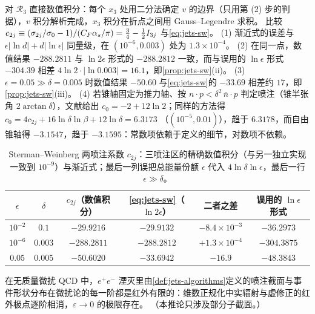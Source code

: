 \begin{example}\label{ex:jets-sw}
对 $\mathcal R_3$ 直接数值积分：每个 $x_3$ 处用二分法确定 $v$ 的边界（只用第 (2) 步的判据），$v$ 积分解析完成，$x_3$ 积分在折点之间用 Gauss--Legendre 求积。
比较 $c_{2j}\equiv(\sigma_{2j}/\sigma_0-1)/(C_F\alpha_s/\pi)=\frac34-\frac12I_{3j}$ 与\cref{eq:jets-sw}。
(1) 渐近式的误差与 $\epsilon|\ln d|+d|\ln\epsilon|$ 同量级，在 $(10^{-6},0.003)$ 处为 $1.3\times10^{-4}$。
(2) 在同一点，数值结果 $-288.2811$ 与 $\ln2\epsilon$ 形式的 $-288.2812$ 一致，而与误用的 $\ln\epsilon$ 形式 $-304.39$ 相差 $4\ln2\cdot|\ln0.003|=16.1$，即\cref{prop:jets-sw}(ii)。
(3) $\epsilon=0.05\gg\delta=0.005$ 时数值结果 $-50.60$ 与\cref{eq:jets-sw}的 $-33.69$ 相差约 $17$，即\cref{prop:jets-sw}(iii)。
(4) 若锥轴固定为推力轴、按 $n\cdot p<\delta^2\,\bar n\cdot p$ 判定喷注（锥半张角 $2\arctan\delta$），文献给出 $c_0=-2+12\ln2$\cite{Becher:2015hka}；同样的方法得 $c_0=4c_{2j}+16\ln\delta\ln\beta+12\ln\delta=6.3173$
（$(10^{-5},0.01)$），趋于 $6.3178$，而自由锥轴得 $-3.1547$，趋于 $-3.1595$：常数项依赖于定义的细节，对数项不依赖。
\end{example}

\begin{table}[htbp]
\centering
\small
\renewcommand{\arraystretch}{1.0}
\begin{tabular}{@{}cccccc@{}}
\toprule
$\epsilon$ & $\delta$ & $c_{2j}$（数值积分） & \cref{eq:jets-sw}（$\ln2\epsilon$） & 二者之差 & 误用的 $\ln\epsilon$ 形式 \\
\midrule
$10^{-2}$ & $0.1$   & $-29.9216$  & $-29.9132$  & $-8.4\times10^{-3}$ & $-36.2973$ \\
$10^{-6}$ & $0.003$ & $-288.2811$ & $-288.2812$ & $+1.3\times10^{-4}$ & $-304.3875$ \\
\midrule
$0.05$    & $0.005$ & $-50.6020$  & $-33.6942$  & $-16.9$             & $-48.3843$ \\
\bottomrule
\end{tabular}
\caption{Sterman--Weinberg 两喷注系数 $c_{2j}$：三喷注区的精确数值积分（与另一独立实现一致到 $10^{-9}$）与渐近式；最后一列误把总能量份额 $\epsilon$ 代入 $4\ln\delta\ln\epsilon$，最后一行 $\epsilon\gg\delta$。}
\label{tab:jets-sw-numerics}
\end{table}

\begin{corollary}\label{cor:jets-ir-finite}
在无质量微扰 QCD 中，$e^+e^-$ 湮灭里由\cref{def:jets-algorithms}定义的喷注截面与事件形状分布在微扰论的每一阶都是红外有限的：维数正规化中实辐射与虚修正的红外极点逐阶相消，$\varepsilon\to0$ 的极限存在。
（本推论只涉及部分子截面。）
\end{corollary}

